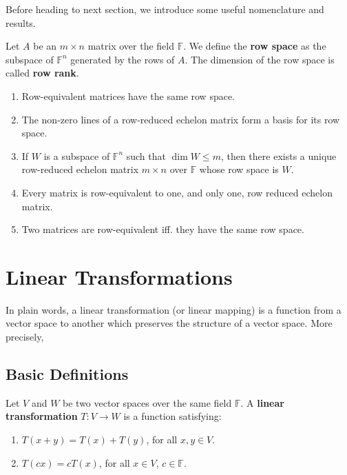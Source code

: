 Before heading to next section, we introduce some useful nomenclature and results.

\begin{definition}
	Let $A$ be an $m \times n$ matrix over the field $\mathbb{F}$. We define the \textbf{row space} as the subspace of $\mathbb{F}^n$ generated by the rows of $A$. The dimension of the row space is called \textbf{row rank}.
\end{definition}

\begin{theorem} \hfill
	\begin{enumerate}
		\item Row-equivalent matrices have the same row space.
		\item The non-zero lines of a row-reduced echelon matrix form a basis for its row space.
		\item If $W$ is a subspace of $\mathbb{F}^n$ such that $\dim W \leq m$, then there exists a unique row-reduced echelon matrix $m \times n$ over $\mathbb{F}$ whose row space is $W$.
		\item Every matrix is row-equivalent to one, and only one, row reduced echelon matrix.
		\item Two matrices are row-equivalent iff. they have the same row space.
	\end{enumerate}
\end{theorem}
 
\section{Linear Transformations}

In plain words, a linear transformation (or linear mapping) is a function from a vector space to another which preserves the structure of a vector space. More precisely,

\subsection{Basic Definitions}

\begin{definition}
	Let $V$ and $W$ be two vector spaces over the same field $\mathbb{F}$. A \textbf{linear transformation} $T : V \longrightarrow W$ is a function satisfying:
	\begin{enumerate}
		\item $T(x+y) = T(x) + T(y)$, for all $x,y \in V$.
		\item $T(c x) = c T(x)$, for all $x \in V$, $c \in \mathbb{F}$.
	\end{enumerate}
\end{definition}

